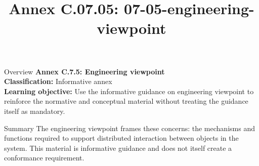 \documentclass[10pt,letterpaper]{article}
\title{Annex C.07.05: 07-05-engineering-viewpoint}
\author{}
\date{}
\begin{document}
\maketitle
\begin{CornellOverviewBox}{Overview}
{\Large\bfseries\textcolor{CNavy}{Annex C.7.5: Engineering viewpoint}}\\[3pt]
{\small\textbf{Classification:} Informative annex}\\
{\small\textbf{Learning objective:} Use the informative guidance on engineering viewpoint to reinforce the normative and conceptual material without treating the guidance itself as mandatory.}
\end{CornellOverviewBox}
\vspace{3pt}

\begin{CornellNotesTable}
\end{CornellNotesTable}


\begin{CornellSummaryBox}{Summary}
The engineering viewpoint frames these concerns: the mechanisms and functions required to support distributed interaction between objects in the system. This material is informative guidance and does not itself create a conformance requirement.
\end{CornellSummaryBox}
\end{document}
